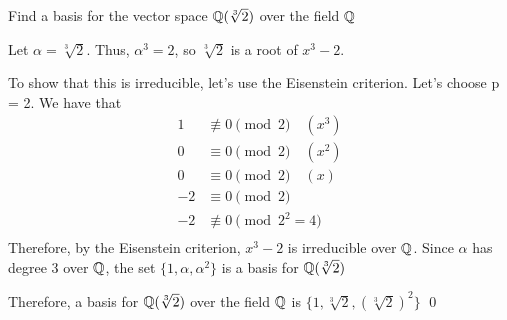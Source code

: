 \documentclass{article}
\begin{document}
\begin{problem}[30.6]
    Find a basis for the vector space $\mathbb{Q}(\sqrt[3]{2})$ over the field $\mathbb{Q}$
\end{problem}
\begin{solution}
    Let $\alpha = \sqrt[3]{2}$. Thus, $\alpha^3 = 2$, so $\sqrt[3]{2}$ is a root of $x^3 - 2$.

    To show that this is irreducible, let's use the Eisenstein criterion. Let's choose p = 2. We have that
    \begin{align*}
        1 &\not\equiv 0 \pmod{2} \quad (x^3)\\
        0 &\equiv 0 \pmod{2} \quad (x^2)\\
        0 &\equiv 0 \pmod{2} \quad (x)\\
        -2 &\equiv 0 \pmod{2} \\ 
        - 2 &\not\equiv 0 \pmod{2^2 = 4} \\
    \end{align*}
    Therefore, by the Eisenstein criterion, $x^3 - 2$ is irreducible over $\mathbb{Q}$. Since $\alpha$ has degree 3 over $\mathbb{Q}$, the set $\{1, \alpha, \alpha^2\}$ is a basis for $\mathbb{Q}(\sqrt[3]{2})$

    Therefore, a basis for $\mathbb{Q}(\sqrt[3]{2})$ over the field $\mathbb{Q}$ is $\{1, \sqrt[3]{2}, (\sqrt[3]{2})^2\}$ \qed
\end{solution}
\end{document}
